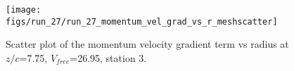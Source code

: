 \begin{figure}[H]
\centering
\texttt{[image: figs/run\_27/run\_27\_momentum\_vel\_grad\_vs\_r\_meshscatter]}
\caption{Scatter plot of the momentum velocity gradient term vs radius at $z/c$=7.75, $V_{free}$=26.95, station 3.}
\label{fig:run_27_momentum_vel_grad_vs_r_meshscatter}
\end{figure}


